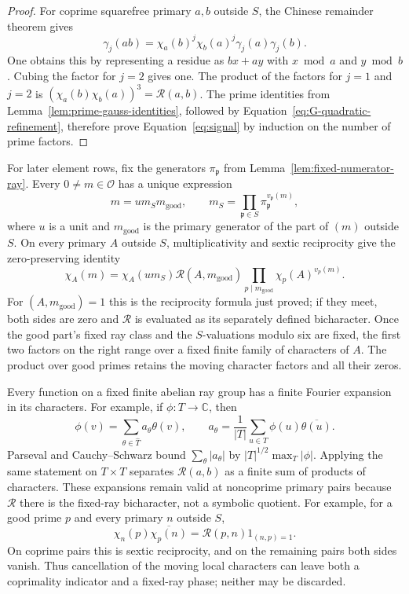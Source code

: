 \documentclass[11pt,a4paper]{article}
\numberwithin{equation}{section}
\numberwithin{figure}{section}
\theoremstyle{definition}
\theoremstyle{remark}
\begin{document}
\begin{proof}
For coprime squarefree primary $a,b$ outside $S$, the Chinese remainder theorem gives
\[
 \gamma_j(ab)=\chi_a(b)^j\chi_b(a)^j\gamma_j(a)\gamma_j(b).
\]
One obtains this by representing a residue as $bx+ay$ with $x\bmod a$ and
$y\bmod b$.  Cubing the factor for $j=2$ gives one.  The product of the
factors for $j=1$ and $j=2$ is
$(\chi_a(b)\chi_b(a))^3=\mathcal R(a,b)$.  The prime identities from
Lemma~\ref{lem:prime-gauss-identities}, followed by
Equation~\eqref{eq:G-quadratic-refinement}, therefore prove
Equation~\eqref{eq:signal} by induction on the number of prime factors.
\end{proof}

For later element rows, fix the generators $\pi_{\mathfrak p}$ from
Lemma~\ref{lem:fixed-numerator-ray}.  Every $0\ne m\in\mathcal O$ has a
unique expression
\[
 m=u m_S m_{\mathrm{good}},\qquad
 m_S=\prod_{\mathfrak p\in S}\pi_{\mathfrak p}^{v_{\mathfrak p}(m)},
\]
where $u$ is a unit and $m_{\mathrm{good}}$ is the primary generator of the
part of $(m)$ outside $S$.  On every primary $A$ outside $S$, multiplicativity
and sextic reciprocity give the zero-preserving identity
\begin{equation}\label{eq:row-fixed-ray-reduction}
 \chi_A(m)=\chi_A(u m_S)\mathcal R(A,m_{\mathrm{good}})
       \prod_{p\mid m_{\mathrm{good}}}\chi_p(A)^{v_p(m)}.
\end{equation}
For $(A,m_{\mathrm{good}})=1$ this is the reciprocity formula just proved;
if they meet, both sides are zero and $\mathcal R$ is evaluated as its
separately defined bicharacter.  Once the good part's fixed ray class and
the $S$-valuations modulo six are fixed, the first two factors on the right
range over a fixed finite family of characters of $A$.  The product over
good primes retains the moving character factors and all their zeros.

Every function on a fixed finite abelian ray group has a finite Fourier
expansion in its characters.  For example, if $\phi:T\to\mathbb C$, then
\[
 \phi(v)=\sum_{\theta\in\widehat T}a_\theta\theta(v),\qquad
 a_\theta=\frac1{|T|}\sum_{u\in T}\phi(u)\overline{\theta(u)}.
\]
Parseval and Cauchy--Schwarz bound $\sum_\theta|a_\theta|$ by
$|T|^{1/2}\max_T|\phi|$.  Applying the same statement on $T\times T$
separates $\mathcal R(a,b)$ as a finite sum of products of characters.
These expansions remain valid at noncoprime primary pairs because
$\mathcal R$ there is the fixed-ray bicharacter, not a symbolic quotient.
For example, for a good prime $p$ and every primary $n$ outside $S$,
\[
 \chi_n(p)\overline{\chi_p(n)}
       =\mathcal R(p,n)1_{(n,p)=1}.
\]
On coprime pairs this is sextic reciprocity, and on the remaining pairs both
sides vanish.  Thus cancellation of the moving local characters can leave
both a coprimality indicator and a fixed-ray phase; neither may be discarded.
\end{document}
